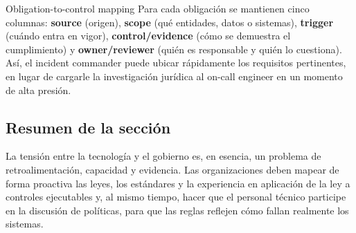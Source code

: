 \begin{importantbox}{Obligation-to-control mapping}
Para cada obligación se mantienen cinco columnas: \textbf{source} (origen), \textbf{scope} (qué entidades, datos o sistemas), \textbf{trigger} (cuándo entra en vigor), \textbf{control/evidence} (cómo se demuestra el cumplimiento) y \textbf{owner/reviewer} (quién es responsable y quién lo cuestiona). Así, el incident commander puede ubicar rápidamente los requisitos pertinentes, en lugar de cargarle la investigación jurídica al on-call engineer en un momento de alta presión.
\end{importantbox}

\subsection{Resumen de la sección}

La tensión entre la tecnología y el gobierno es, en esencia, un problema de retroalimentación, capacidad y evidencia. Las organizaciones deben mapear de forma proactiva las leyes, los estándares y la experiencia en aplicación de la ley a controles ejecutables y, al mismo tiempo, hacer que el personal técnico participe en la discusión de políticas, para que las reglas reflejen cómo fallan realmente los sistemas.
